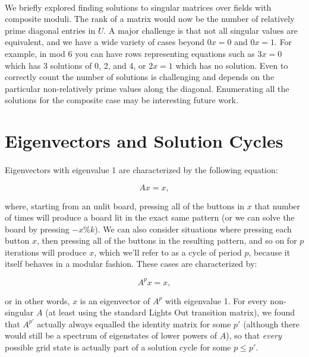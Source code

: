 \documentclass[11pt]{article}
\begin{document}
\paragraph{} We briefly explored finding solutions to singular matrices over fields with composite moduli.  The rank of a matrix would now be the number of relatively prime diagonal entries in $U$.  A major challenge is that not all singular values are equivalent, and we have a wide variety of cases beyond $0x = 0$ and $0x =1$.  For example, in mod 6 you can have rows representing equations such as $3x = 0$ which has 3 solutions of 0, 2, and 4, or $2x = 1$ which has no solution.  Even to correctly count the number of solutions is challenging and depends on the particular non-relatively prime values along the diagonal.  Enumerating all the solutions for the composite case may be interesting future work.

\section*{Eigenvectors and Solution Cycles}

\paragraph{} Eigenvectors with eigenvalue 1 are characterized by the following equation:

\begin{equation}
Ax = x,
\end{equation}

\noindent where, starting from an unlit board, pressing all of the buttons in $x$ that number of times will produce a board lit in the exact same pattern (or we can solve the board by pressing $-x \% k$). We can also consider situations where pressing each button $x$, then pressing all of the buttons in the resulting pattern, and so on for $p$ iterations will produce $x$, which we'll refer to as a cycle of period $p$, because it itself behaves in a modular fashion. These cases are characterized by:

\begin{equation}
A^px = x,
\end{equation}

\noindent or in other words, $x$ is an eigenvector of $A^p$ with eigenvalue 1. For every non-singular $A$ (at least using the standard Lights Out transition matrix), we found that $A^{p'}$ actually always equalled the identity matrix for some $p'$ (although there would still be a spectrum of eigenstates of lower powers of $A$), so that \textit{every} possible grid state is actually part of a solution cycle for some $p \leq p'$.
\end{document}
